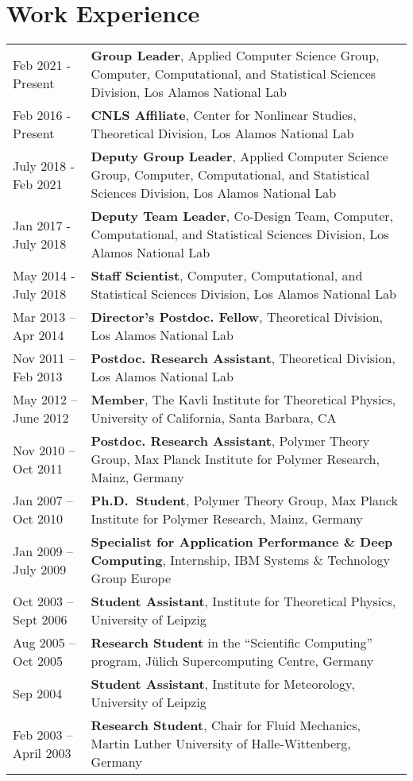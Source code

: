 \documentclass{article}
\begin{document}
\section*{Work Experience}
\begin{longtable}{p{}p{}}
Feb 2021 - Present & \textbf{Group Leader}, Applied Computer Science Group, Computer, Computational, and Statistical Sciences Division, Los Alamos National Lab \\
Feb 2016 - Present & \textbf{CNLS Affiliate}, Center for Nonlinear Studies, Theoretical Division, Los Alamos National Lab \\
July 2018 - Feb 2021 & \textbf{Deputy Group Leader}, Applied Computer Science Group, Computer, Computational, and Statistical Sciences Division, Los Alamos National Lab \\
Jan 2017 - July 2018 & \textbf{Deputy Team Leader}, Co-Design Team, Computer, Computational, and Statistical Sciences Division, Los Alamos National Lab \\
May 2014 - July 2018 & \textbf{Staff Scientist}, Computer, Computational, and Statistical Sciences Division, Los Alamos National Lab \\
Mar 2013 -- Apr 2014 & \textbf{Director's Postdoc. Fellow}, Theoretical Division, Los Alamos National Lab\\
Nov 2011 -- Feb 2013 & \textbf{Postdoc. Research Assistant}, Theoretical Division, Los Alamos National Lab\\
May 2012 -- June 2012 & \textbf{Member}, The Kavli Institute for Theoretical Physics, University of California, Santa Barbara, CA \\
Nov 2010 -- Oct 2011 & \textbf{Postdoc. Research Assistant}, Polymer Theory Group, Max Planck Institute for Polymer Research, Mainz, Germany\\
Jan 2007 -- Oct 2010 & \textbf{Ph.D.\ Student}, Polymer Theory Group, Max Planck Institute for Polymer Research, Mainz, Germany\\
Jan 2009 -- July 2009 & \textbf{Specialist for Application Performance \& Deep Computing}, Internship, IBM Systems \& Technology Group Europe \\
Oct 2003 -- Sept 2006 & \textbf{Student Assistant}, Institute for Theoretical Physics, University of Leipzig \\
Aug 2005 -- Oct 2005 & \textbf{Research Student} in the ``Scientific Computing'' program, J{\"u}lich Supercomputing Centre, Germany \\
Sep 2004 & \textbf{Student Assistant}, Institute for Meteorology, University of Leipzig \\
Feb 2003 -- April 2003 & \textbf{Research Student}, Chair for Fluid Mechanics, Martin Luther University of Halle-Wittenberg, Germany \\
\end{longtable}
\end{document}
